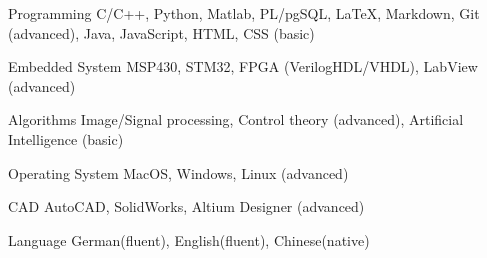 

\begin{cvskills}

  \cvskill
    {Programming} %
    {C/C++, Python, Matlab, PL/pgSQL, \LaTeX, Markdown, Git (advanced), Java, JavaScript, HTML, CSS (basic)} %

  \cvskill
    {Embedded System} %
    {MSP430, STM32,  FPGA (VerilogHDL/VHDL), LabView (advanced)} %

  \cvskill
    {Algorithms} %
    {Image/Signal processing, Control theory (advanced), Artificial Intelligence (basic)} %

  \cvskill
	{Operating System} %
  {MacOS, Windows, Linux (advanced)} %
  
  \cvskill
    {CAD} %
    {AutoCAD, SolidWorks, Altium Designer (advanced)} %


 \cvskill
   {Language} %
   {German(fluent), English(fluent), Chinese(native)} %

\end{cvskills}

